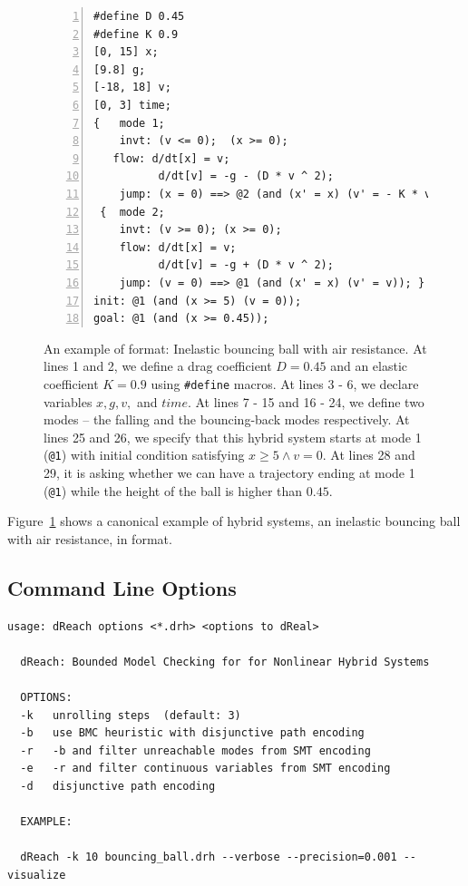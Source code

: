 \begin{figure}
  \centering
  \begin{Verbatim}[fontfamily=courier, frame=single, framesep=1mm,
  numbers=left, fontsize=\scriptsize]
#define D 0.45
#define K 0.9
[0, 15] x;
[9.8] g;
[-18, 18] v;
[0, 3] time;
{   mode 1;
    invt: (v <= 0);  (x >= 0);
   flow: d/dt[x] = v;
          d/dt[v] = -g - (D * v ^ 2);
    jump: (x = 0) ==> @2 (and (x' = x) (v' = - K * v)); }
 {  mode 2;
    invt: (v >= 0); (x >= 0);
    flow: d/dt[x] = v;
          d/dt[v] = -g + (D * v ^ 2);
    jump: (v = 0) ==> @1 (and (x' = x) (v' = v)); }
init: @1 (and (x >= 5) (v = 0));
goal: @1 (and (x >= 0.45));
\end{Verbatim}
\caption{An example of \drh{} format: Inelastic bouncing ball with air
  resistance. At lines 1 and 2, we define a drag coefficient $D = 0.45$
  and an elastic coefficient $K = 0.9$ using \texttt{\#define} macros.
  At lines 3 - 6, we declare variables $x, g, v,$ and $time$. At lines
  7 - 15 and 16 - 24, we define two modes -- the falling and the
  bouncing-back modes respectively. At lines 25 and 26, we specify
  that this hybrid system starts at mode 1 (\texttt{@1}) with initial
  condition satisfying $x \ge 5 \land v = 0$. At lines 28 and 29, it
  is asking whether we can have a trajectory ending at mode 1
  (\texttt{@1}) while the height of the ball is higher than $0.45$.}
\label{fig:bouncing-ball-drh}
\end{figure}

Figure~\ref{fig:bouncing-ball-drh} shows a canonical example of hybrid
systems, an inelastic bouncing ball with air resistance, in \drh{}
format.

\subsection{Command Line Options}

\begin{Verbatim}[fontfamily=courier, frame=single, framesep=1mm, fontsize=\scriptsize]
  usage: dReach options <*.drh> <options to dReal>

  dReach: Bounded Model Checking for for Nonlinear Hybrid Systems

  OPTIONS:
  -k   unrolling steps  (default: 3)
  -b   use BMC heuristic with disjunctive path encoding
  -r   -b and filter unreachable modes from SMT encoding
  -e   -r and filter continuous variables from SMT encoding
  -d   disjunctive path encoding

  EXAMPLE:

  dReach -k 10 bouncing_ball.drh --verbose --precision=0.001 --visualize

\end{Verbatim}

